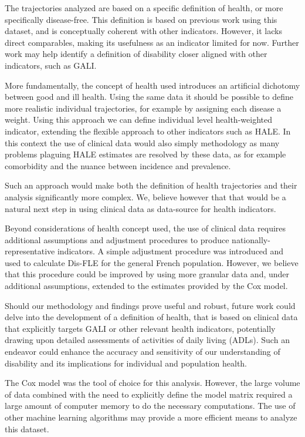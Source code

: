 \documentclass{article}
\begin{document}
The trajectories analyzed are based on a specific definition of health,
or more specifically disease-free. This definition is based on previous
work using this dataset, and is conceptually coherent with other
indicators. However, it lacks direct comparables, making its usefulness
as an indicator limited for now. Further work may help identify a
definition of disability closer aligned with other indicators, such as
GALI.

More fundamentally, the concept of health used introduces an artificial
dichotomy between good and ill health. Using the same data it should be
possible to define more realistic individual trajectories, for example
by assigning each disease a weight. Using this approach we can define
individual level health-weighted indicator, extending the flexible
approach to other indicators such as HALE. In this context the use of
clinical data would also simply methodology as many problems plaguing
HALE estimates are resolved by these data, as for example comorbidity
and the nuance between incidence and prevalence.

Such an approach would make both the definition of health trajectories
and their analysis significantly more complex. We, believe however that
that would be a natural next step in using clinical data as data-source
for health indicators.

Beyond considerations of health concept used, the use of clinical data
requires additional assumptions and adjustment procedures to produce
nationally-representative indicators. A simple adjustment procedure was
introduced and used to calculate Dis-FLE for the general French
population. However, we believe that this procedure could be improved by
using more granular data and, under additional assumptions, extended to
the estimates provided by the Cox model.

Should our methodology and findings prove useful and robust, future work
could delve into the development of a definition of health, that is
based on clinical data that explicitly targets GALI or other relevant
health indicators, potentially drawing upon detailed assessments of
activities of daily living (ADLs). Such an endeavor could enhance the
accuracy and sensitivity of our understanding of disability and its
implications for individual and population health.

The Cox model was the tool of choice for this analysis. However, the
large volume of data combined with the need to explicitly define the
model matrix required a large amount of computer memory to do the
necessary computations. The use of other machine learning algorithms may
provide a more efficient means to analyze this dataset.
\end{document}
